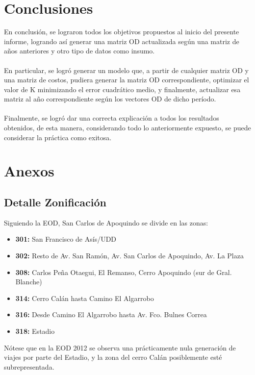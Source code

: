 \documentclass[12pt]{article} %
\begin{document}
\section{Conclusiones}

En conclusión, se lograron todos los objetivos propuestos al inicio del presente informe, logrando así generar una matriz OD actualizada según una matriz de años anteriores y otro tipo de datos como insumo.
\\ \\
En particular, se logró generar un modelo que, a partir de cualquier matriz OD y una matriz de costos, pudiera generar la matriz OD correspondiente, optimizar el valor de K minimizando el error cuadrático medio, y finalmente, actualizar esa matriz al año correspondiente según los vectores OD de dicho período.
\\ \\
Finalmente, se logró dar una correcta explicación a todos los resultados obtenidos, de esta manera, considerando todo lo anteriormente expuesto, se puede considerar la práctica como exitosa.

\newpage
\section{Anexos}

\subsection{Detalle Zonificación}

Siguiendo la EOD, San Carlos de Apoquindo se divide en las zonas:

\begin{itemize}
    \item \textbf{301:} San Francisco de Asís/UDD
    \item \textbf{302:} Resto de Av. San Ramón, Av. San Carlos de Apoquindo, Av. La Plaza
    \item \textbf{308:} Carlos Peña Otaegui, El Remanso, Cerro Apoquindo (sur de Gral. Blanche)
    \item \textbf{314:} Cerro Calán hasta Camino El Algarrobo
    \item \textbf{316:} Desde Camino El Algarrobo hasta Av. Fco. Bulnes Correa
    \item \textbf{318:} Estadio
\end{itemize}

Nótese que en la EOD 2012 se observa una prácticamente nula generación de viajes por parte del Estadio, y la zona del cerro Calán posiblemente esté subrepresentada.
\end{document}
